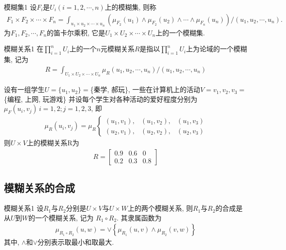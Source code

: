 {%
\begin{mydef}{模糊集}{1}
设$F_i$是$U_i(i=1,2,\cdots,n)$上的模糊集, 则称
 \begin{align}
   F_{1} \times F_{2} \times \cdots \times F_{n}=
    \int_{u_{1} \times u_{2} \times \cdots \times u_{n}}\left(\mu_{F_{2}}(u_{1}) \wedge \mu_{F_{2}}\left(u_{2}\right)
    \wedge \cdots \wedge \mu_{F_{n}}\left(u_{n}\right)\right) /\left(u_{1}, u_{2}, \cdots, u_{n}\right).
 \end{align}
为$F_1,F_2,\cdots,F_n$的笛卡尔乘积, 它是$U_1\times U_2\times\cdots\times U_n$上的一个模糊集.
\end{mydef}
\begin{mydef}{模糊关系}{1}
在$\prod_{i=1}^n U_i$上的一个$n$元模糊关系$R$是指以$\prod_{i=1}^n U_i$上为论域的一个模糊集, 记为
\begin{align}
  R=\int_{U_1\times U_2\times\cdots\times U_n} \mu_{R}\left(u_{1}, u_{2}, \cdots, u_{n}\right) /\left(u_{1}, u_{2}, \cdots, u_{n}\right)
\end{align}
\end{mydef}

\begin{example}
设有一组学生$U=\{u_1,u_2\}=$\{秦学, 郝玩\}, 一些在计算机上的活动$V={v_1,v_2,v_3}=$\{编程, 上网, 玩游戏\}
并设每个学生对各种活动的爱好程度分别为 $\mu_{F}\left(u_{i}, v_{j}\right)\, i=1,2; j=1,2,3$, 即
\begin{align}
  \mu_{R}(u_i,v_j)=
  \mu_{R}
  \left\{
  \begin{array}{llll}
    (u_1,v_1),&(u_1,v_2),&(u_1,v_3)\\
    (u_2,v_1),&(u_2,v_2),&(u_2,v_3)
  \end{array}
  \right.
\end{align}
则$U\times V$上的模糊关系R为
\begin{align}
  R=\left[\begin{array}{lll}{0.9} & {0.6} & {0} \\ {0.2} & {0.3} & {0.8}\end{array}\right]
\end{align}
\end{example}
\subsection{模糊关系的合成}
\begin{mydef}{模糊关系}{1}
设$R_1$与$R_2$分别是$U\times V$与$U\times W$上的两个模糊关系, 则$R_1$与$R_2$的合成是从$U$到$W$的一个模糊关系, 记为   $R_1\circ R_2$. 其隶属函数为
\begin{align}
  \mu_{R_{1}\circ R_{2}}(u, w)=\vee\left\{\mu_{R_{1}}(u, v) \wedge \mu_{R_{2}}(v, w)\right\}
\end{align}
其中, $\wedge$和$\vee$分别表示取最小和取最大.
\end{mydef}

}
